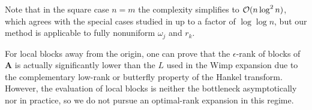 Note that in the square case $n=m$ the complexity simplifies to $\mathcal{O}(n\log^2n)$,
which agrees with the special cases studied in \cite{townsend2015fast} up to a
factor of $\log\log n$, but our method is applicable to fully nonuniform
$\omega_j$ and $r_k$.

\begin{remark}
    For local blocks away from the origin, one can prove that the $\epsilon$-rank of blocks of $\bm{A}$ is actually significantly lower than the $L$ used in the Wimp expansion due to the complementary low-rank or butterfly property of the Hankel transform. However, the evaluation of local blocks is neither the bottleneck asymptotically nor in practice, so we do not pursue an optimal-rank expansion in this regime.
\end{remark}